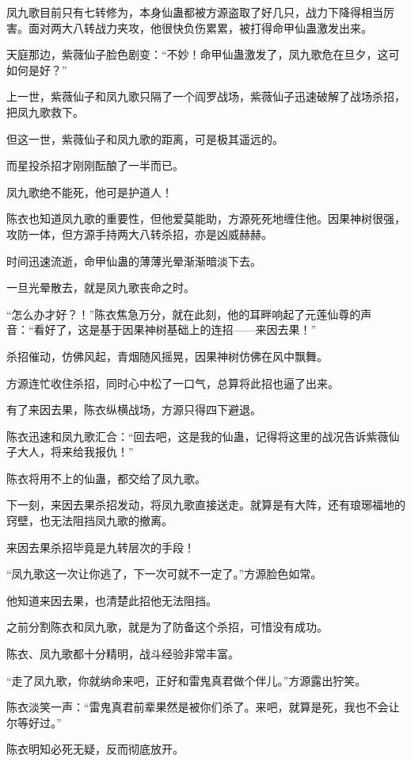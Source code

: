\begin{this_body}
凤九歌目前只有七转修为，本身仙蛊都被方源盗取了好几只，战力下降得相当厉害。面对两大八转战力夹攻，他很快负伤累累，被打得命甲仙蛊激发出来。

天庭那边，紫薇仙子脸色剧变：“不妙！命甲仙蛊激发了，凤九歌危在旦夕，这可如何是好？”

上一世，紫薇仙子和凤九歌只隔了一个阎罗战场，紫薇仙子迅速破解了战场杀招，把凤九歌救下。

但这一世，紫薇仙子和凤九歌的距离，可是极其遥远的。

而星投杀招才刚刚酝酿了一半而已。

凤九歌绝不能死，他可是护道人！

陈衣也知道凤九歌的重要性，但他爱莫能助，方源死死地缠住他。因果神树很强，攻防一体，但方源手持两大八转杀招，亦是凶威赫赫。

时间迅速流逝，命甲仙蛊的薄薄光晕渐渐暗淡下去。

一旦光晕散去，就是凤九歌丧命之时。

“怎么办才好？！”陈衣焦急万分，就在此刻，他的耳畔响起了元莲仙尊的声音：“看好了，这是基于因果神树基础上的连招——来因去果！”

杀招催动，仿佛风起，青烟随风摇晃，因果神树仿佛在风中飘舞。

方源连忙收住杀招，同时心中松了一口气，总算将此招也逼了出来。

有了来因去果，陈衣纵横战场，方源只得四下避退。

陈衣迅速和凤九歌汇合：“回去吧，这是我的仙蛊，记得将这里的战况告诉紫薇仙子大人，将来给我报仇！”

陈衣将用不上的仙蛊，都交给了凤九歌。

下一刻，来因去果杀招发动，将凤九歌直接送走。就算是有大阵，还有琅琊福地的窍壁，也无法阻挡凤九歌的撤离。

来因去果杀招毕竟是九转层次的手段！

“凤九歌这一次让你逃了，下一次可就不一定了。”方源脸色如常。

他知道来因去果，也清楚此招他无法阻挡。

之前分割陈衣和凤九歌，就是为了防备这个杀招，可惜没有成功。

陈衣、凤九歌都十分精明，战斗经验非常丰富。

“走了凤九歌，你就纳命来吧，正好和雷鬼真君做个伴儿。”方源露出狞笑。

陈衣淡笑一声：“雷鬼真君前辈果然是被你们杀了。来吧，就算是死，我也不会让尔等好过。”

陈衣明知必死无疑，反而彻底放开。


\end{this_body}
